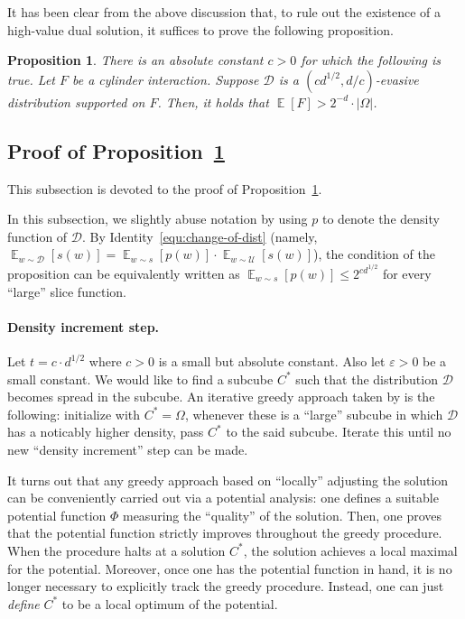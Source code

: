 \documentclass[11pt]{article}
\newtheorem{prop}[theorem]{Proposition}
\DeclareMathOperator*{\E}{\mathbb{E}}
\newcommand{\1}{ \mathbbm{1}}
\newcommand{\eps}{\varepsilon}
\begin{document}
It has been clear from the above discussion that, to rule out the existence of a high-value dual solution, it suffices to prove the following proposition.

\begin{prop}\label{prop:evasive-to-largeness}
    There is an absolute constant $c > 0$ for which the following is true. Let $F$ be a cylinder interaction. Suppose $\mathcal{D}$ is a $(cd^{1/2}, d/c)$-evasive distribution supported on $F$.
    Then, it holds that $\E[F] > 2^{-d}\cdot |\Omega|$.
\end{prop}

\subsection{Proof of Proposition~\ref{prop:evasive-to-largeness}}

This subsection is devoted to the proof of Proposition~\ref{prop:evasive-to-largeness}.

In this subsection, we slightly abuse notation by using $p$ to denote the density function of $\mathcal{D}$. By Identity~\eqref{equ:change-of-dist} (namely, $\E_{w\sim \mathcal{D}}[s(w)] = \E_{w\sim s}[p(w)] \cdot{\E_{w\sim \mathcal{U}}[s(w)]}$), the condition of the proposition can be equivalently written as $\E_{w\sim s}[p(w)] \le 2^{c d^{1/2}}$ for every ``large'' slice function.


\paragraph*{Density increment step.} Let $t = c\cdot d^{1/2}$ where $c>0$ is a small but absolute constant. Also let $\eps > 0$ be a small constant. We would like to find a subcube $C^*$ such that the distribution $\mathcal{D}$ becomes spread in the subcube. An iterative greedy approach taken by \cite{KelleyLM2024-nof} is the following: initialize with $C^* = \Omega$, whenever these is a ``large'' subcube in which $\mathcal{D}$ has a noticably higher density, pass $C^*$ to the said subcube. Iterate this until no new ``density increment'' step can be made. 

It turns out that any greedy approach based on ``locally'' adjusting the solution can be conveniently carried out via a potential analysis: one defines a suitable potential function $\Phi$ measuring the ``quality'' of the solution. Then, one proves that the potential function strictly improves throughout the greedy procedure. When the procedure halts at a solution $C^*$, the solution achieves a local maximal for the potential. Moreover, once one has the potential function in hand, it is no longer necessary to explicitly track the greedy procedure. Instead, one can just \emph{define} $C^*$ to be a local optimum of the potential.
\end{document}
